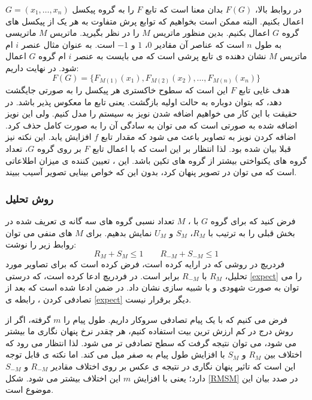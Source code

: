 در روابط بالا، $ F(G) $ بدان معنا است که تابع $ F $ را به گروه پیکسل $ G=(x_{1},\ldots ,x_{n} ) $ اعمال بکنیم. البته ممکن است بخواهیم که توابع پرش متفاوت به هر یک از پیکسل های گروه $ G $ اعمال بکنیم. بدین منظور ماتریس $ M $ را در نظر بگیرید. ماتریس $ M $ ماتریسی به طول $ n $ است که عناصر آن مقادیر $ 0 $، $ 1 $ و $ -1 $ است. به عنوان مثال عنصر $ i $ ام ماتریس $ M $ نشان دهنده ی تابع پرشی است که می بایست به عنصر $ i $ ام گروه $ G $ اعمال شود. در نهایت داریم:
\begin{equation}
F(G)=\lbrace F_{M(1)}(x_{1}),F_{M(2)}(x_{2}),\ldots ,F_{M(n)}(x_{n}) \rbrace
\end{equation}
هدف غایی تابع $ F $  این است که سطوح خاکستری هر پیکسل را به صورتی جایگشت دهد، که بتوان دوباره به حالت اولیه بازگشت. یعنی تابع ما معکوس پذیر باشد. در حقیقت با این کار می خواهیم اضافه شدن نویز به سیستم را مدل کنیم. ولی این نویز اضافه شده به صورتی است که می توان به سادگی آن را به صورت کامل حذف کرد. اضافه کردن نویز به تصاویر باعث می شود که مقدار تابع $ f $ افزایش یابد. این نکته نیز قبلا بیان شده بود. لذا انتظار بر این است که با اعمال تابع $ F $ بر روی گروه $ G $، تعداد گروه های یکنواختی بیشتر از گروه های تکین باشد. این {}، تعیین کننده ی میزان اطلاعاتی است که می توان در تصویر پنهان کرد، بدون این که خواص بینایی تصویر آسیب ببیند. 

\subsubsection{روش تحلیل}
فرض کنید که برای گروه $ G $ با {}، {$ M $} تعداد نسبی گروه های سه گانه ی تعریف شده در بخش قبلی را به ترتیب با $ R_{M} $، $ S_{M} $ و $ U_{M} $ نمایش بدهیم. برای $ M $ های منفی می توان روابط زیر را نوشت:
\begin{equation}
\label{expect}
R_{M}+S_{M}\leq 1\qquad R_{-M}+S_{-M}\leq 1
\end{equation}
فردریچ{}  در روشی که در \cite{Fridrich2001_Detecting} ارایه کرده است، فرض کرده است که برای تصاویر مورد تحلیل، {} { $ R_{M} $} با {$ R_{-M} $} برابر است. در \cite{Fridrich2001_Detecting} فردریچ ادعا کرده است، که درستی \ref{expect} را می توان به صورت شهودی و با شبیه سازی نشان داد. در ضمن ادعا شده است که بعد از تصادفی کردن {}، رابطه ی \ref{expect} دیگر برقرار نیست. 
 
 فرض می کنیم که با یک پیام تصادفی سروکار داریم. طول پیام را $ m $ گرفته، اگر از روش درج در کم ارزش ترین بیت استفاده کنیم، هر چقدر نرخ پنهان نگاری ما بیشتر می شود، می توان نتیجه گرفت که سطح {} تصادفی تر می شود. لذا انتظار می رود که اختلاف بین $ R_{M} $ و $ S_{M} $ با افزایش طول پیام به صفر میل می کند. اما نکته ی قابل توجه این است که تاثیر پنهان نگاری در {} نتیجه ی عکس بر روی اختلاف مقادیر $ R_{-M} $ و $ S_{-M} $ دارد؛ یعنی با افزایش $ m $ این اختلاف بیشتر می شود. شکل \ref{RMSM} در صدد بیان این موضوع است.
 

